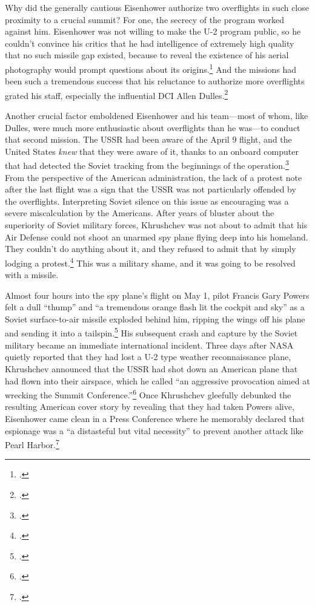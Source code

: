 \documentclass{report}
\begin{document}
\begin{refsegment}
Why did the generally cautious Eisenhower authorize two overflights in such close proximity to a crucial summit? For one, the secrecy of the program worked against him. Eisenhower was not willing to make the U-2 program public, so he couldn't convince his critics that he had intelligence of extremely high quality that no such missile gap existed, because to reveal the existence of his aerial photography would prompt questions about its origins.\footcite[p.~51]{lindgren_trust_2000} And the missions had been such a tremendous success that his reluctance to authorize more overflights grated his staff, especially the influential DCI Allen Dulles.\footcite[p.~354]{brugioni_eyes_2010}

Another crucial factor emboldened Eisenhower and his team---most of whom, like Dulles, were much more enthusiastic about overflights than he was---to conduct that second mission. The USSR had been aware of the April 9 flight, and the United States \emph{knew} that they were aware of it, thanks to an onboard computer that had detected the Soviet tracking from the beginnings of the operation.\footcite{pedlow_cia_1998} From the perspective of the American administration, the lack of a protest note after the last flight was a sign that the USSR was not particularly offended by the overflights. Interpreting Soviet silence on this issue as encouraging was a severe miscalculation by the Americans. After years of bluster about the superiority of Soviet military forces, Khrushchev was not about to admit that his Air Defense could not shoot an unarmed spy plane flying deep into his homeland. They couldn't do anything about it, and they refused to admit that by simply lodging a protest.\footcite[p.~59]{powers_operation_2004} This was a military shame, and it was going to be resolved with a missile.

Almost four hours into the spy plane's flight on May 1, pilot Francis Gary Powers felt a dull ``thump'' and ``a tremendous orange flash lit the cockpit and sky'' as a Soviet surface-to-air missile exploded behind him, ripping the wings off his plane and sending it into a tailspin.\footcite[p.~61]{powers_operation_2004} His subsequent crash and capture by the Soviet military became an immediate international incident. Three days after NASA quietly reported that they had lost a U-2 type weather reconnaissance plane, Khrushchev announced that the USSR had shot down an American plane that had flown into their airspace, which he called ``an aggressive provocation aimed at wrecking the Summit Conference.''\footcite[p.~112]{powers_operation_2004} Once Khrushchev gleefully debunked the resulting American cover story by revealing that they had taken Powers alive, Eisenhower came clean in a Press Conference where he memorably declared that espionage was a ``a distasteful but vital necessity'' to prevent another attack like Pearl Harbor.\footcite{eisenhower_news_1960}


\end{refsegment}
\end{document}

